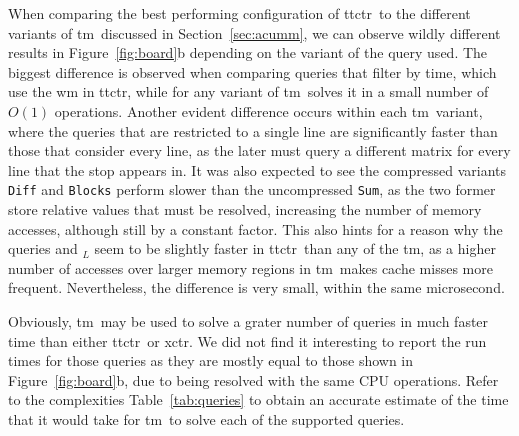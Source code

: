     When comparing the best performing configuration of \gls{ttctr}~to the different variants of \gls{tm}~discussed in Section~\ref{sec:acumm}, we can observe wildly different results in Figure~\ref{fig:board}b depending on the variant of the \boardX query used. The biggest difference is observed when comparing queries that filter by time, which use the \gls{wm} in \gls{ttctr}, while for any variant of \gls{tm}~solves it in a small number of $O(1)$ operations. Another evident difference occurs within each \gls{tm}~variant, where the queries that are restricted to a single line are significantly faster than those that consider every line, as the later must query a different matrix for every line that the stop appears in. It was also expected to see the compressed variants \texttt{Diff} and \texttt{Blocks} perform slower than the uncompressed \texttt{Sum}, as the two former store relative values that must be resolved, increasing the number of memory accesses, although still by a constant factor. This also hints for a reason why the queries \boardX and \boardX$_{L}$ seem to be slightly faster in \gls{ttctr}~than any of the \gls{tm}, as a higher number of accesses over larger memory regions in \gls{tm}~makes cache misses more frequent. Nevertheless, the difference is very small, within the same microsecond.
    
    Obviously, \gls{tm}~may be used to solve a grater number of queries in much faster time than either \gls{ttctr}~or \gls{xctr}. We did not find it interesting to report the run times for those queries as they are mostly equal to those shown in Figure~\ref{fig:board}b, due to being resolved with the same CPU operations. Refer to the complexities Table~\ref{tab:queries} to obtain an accurate estimate of the time that it would take for \gls{tm}~to solve each of the supported queries.
